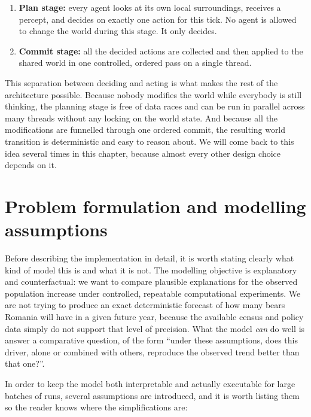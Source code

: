 \begin{enumerate}
    \item \textbf{Plan stage:} every agent looks at its own local surroundings, receives a percept, and decides on exactly one action for this tick. No agent is allowed to change the world during this stage. It only decides.
    \item \textbf{Commit stage:} all the decided actions are collected and then applied to the shared world in one controlled, ordered pass on a single thread.
\end{enumerate}

This separation between deciding and acting is what makes the rest of the architecture possible. Because nobody modifies the world while everybody is still thinking, the planning stage is free of data races and can be run in parallel across many threads without any locking on the world state. And because all the modifications are funnelled through one ordered commit, the resulting world transition is deterministic and easy to reason about. We will come back to this idea several times in this chapter, because almost every other design choice depends on it.

\section{Problem formulation and modelling assumptions}

Before describing the implementation in detail, it is worth stating clearly what kind of model this is and what it is not. The modelling objective is explanatory and counterfactual: we want to compare plausible explanations for the observed population increase under controlled, repeatable computational experiments. We are not trying to produce an exact deterministic forecast of how many bears Romania will have in a given future year, because the available census and policy data simply do not support that level of precision. What the model \emph{can} do well is answer a comparative question, of the form ``under these assumptions, does this driver, alone or combined with others, reproduce the observed trend better than that one?''.

In order to keep the model both interpretable and actually executable for large batches of runs, several assumptions are introduced, and it is worth listing them so the reader knows where the simplifications are:

